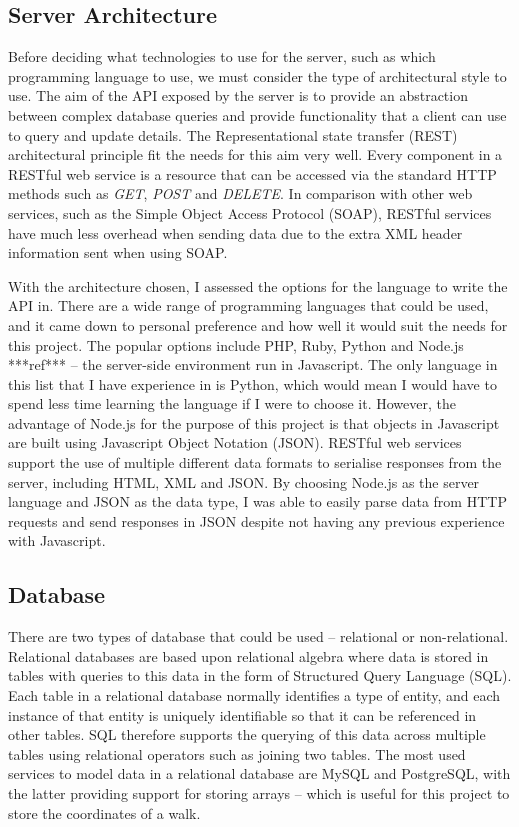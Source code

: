 
\subsection{Server Architecture}

Before deciding what technologies to use for the server, such as which programming language to use, we must consider the type of architectural style to use. The aim of the API exposed by the server is to provide an abstraction between complex database queries and provide functionality that a client can use to query and update details. The Representational state transfer (REST) architectural principle fit the needs for this aim very well. Every component in a RESTful web service is a resource that can be accessed via the standard HTTP methods such as \textit{GET}, \textit{POST} and \textit{DELETE}. In comparison with other web services, such as the Simple Object Access Protocol (SOAP), RESTful services have much less overhead when sending data due to the extra XML header information sent when using SOAP.

With the architecture chosen, I assessed the options for the language to write the API in. There are a wide range of programming languages that could be used, and it came down to personal preference and how well it would suit the needs for this project. The popular options include PHP, Ruby, Python and Node.js ***ref*** -- the server-side environment run in Javascript. The only language in this list that I have experience in is Python, which would mean I would have to spend less time learning the language if I were to choose it. However, the advantage of Node.js for the purpose of this project is that objects in Javascript are built using Javascript Object Notation (JSON). RESTful web services support the use of multiple different data formats to serialise responses from the server, including HTML, XML and JSON. By choosing Node.js as the server language and JSON as the data type, I was able to easily parse data from HTTP requests and send responses in JSON despite not having any previous experience with Javascript.

\subsection{Database}

There are two types of database that could be used -- relational or non-relational. Relational databases are based upon relational algebra where data is stored in tables with queries to this data in the form of Structured Query Language (SQL). Each table in a relational database normally identifies a type of entity, and each instance of that entity is uniquely identifiable so that it can be referenced in other tables. SQL therefore supports the querying of this data across multiple tables using relational operators such as joining two tables. The most used services to model data in a relational database are MySQL and PostgreSQL, with the latter providing support for storing arrays -- which is useful for this project to store the coordinates of a walk.

